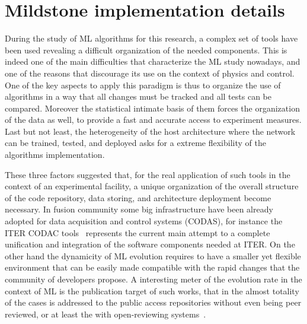 \chapter{Mildstone implementation details}
\label{section:5_mildstone}

During the study of ML algorithms for this research, a complex set of tools have been used revealing a difficult organization of the needed components.
This is indeed one of the main difficulties that characterize the ML study nowadays, and one of the reasons that discourage its use on the context of physics and control.
One of the key aspects to apply this paradigm is thus to organize the use of algorithms in a way that all changes must be tracked and all tests can be compared.
Moreover the statistical intimate basis of them forces the organization of the data as well, to provide a fast and accurate access to experiment measures. 
Last but not least, the heterogeneity of the host architecture where the network can be trained, tested, and deployed asks for a extreme flexibility of the algorithms implementation.

These three factors suggested that, for the real application of such tools in the context of an experimental facility, a unique organization of the overall structure of the code repository, data storing, and architecture deployment become necessary.
In fusion community some big infrastructure have been already adopted for data acquisition and control systems (CODAS), for instance the ITER CODAC tools~\cite{iter_CODAC} represents the current main attempt to a complete unification and integration of the software components needed at ITER.
On the other hand the dynamicity of ML evolution requires to have a smaller yet flexible environment that can be easily made compatible with the rapid changes that the community of developers propose.
A interesting meter of the evolution rate in the context of ML is the publication target of such works, that in the almost totality of the cases is addressed to the public access repositories without even being peer reviewed, or at least the with open-reviewing systems~\cite{open_review}. 


